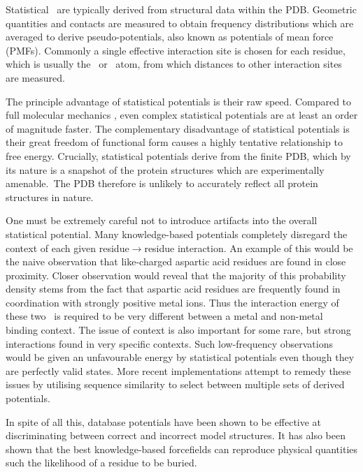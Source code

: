  Statistical \forcefields\ are typically derived from structural data within the
PDB. Geometric quantities and contacts are measured to obtain frequency distributions
which are averaged to derive pseudo-potentials, also known as potentials of mean force (PMFs). Commonly a single effective interaction site is chosen
for each residue, which is usually the \ca\ or \cb\ atom, from which distances
to other interaction sites are measured\cite{FORCEFIELD:REVIEW:KNOWLEDGEBASED}.

The principle advantage of statistical potentials is their raw speed. Compared
to full molecular mechanics \forcefields, even complex statistical potentials are at least an order of magnitude faster. The complementary disadvantage of statistical potentials is their great freedom of functional form causes
a highly tentative relationship to free energy. Crucially, statistical potentials derive from the finite PDB, which by its nature is a snapshot of the protein structures which are experimentally amenable.\
The PDB therefore is unlikely to accurately reflect all protein structures in nature.

One must be extremely careful not to introduce artifacts into the overall statistical potential. Many knowledge-based potentials completely disregard the context of each given
residue$\to$residue interaction.  An example of this would
be the naive observation that like-charged aspartic acid residues are found
in close proximity. Closer observation would reveal that the majority of
this probability density stems from the fact that aspartic acid residues
are frequently found in coordination with strongly positive metal ions. Thus
the interaction energy of these two \sidechains\ is required to be very different
between a metal and non-metal binding context. The issue of context is also
important for some rare, but strong interactions found in very specific contexts.
Such low-frequency observations would be given an unfavourable energy by
statistical potentials even though they are perfectly valid states. More
recent implementations attempt to remedy these issues by utilising sequence
similarity to select between multiple sets of derived potentials\cite{FORCEFIELD:Skolnick2000}.

In spite of all this, database potentials have been shown to be effective at discriminating between correct and incorrect model structures. It has also been shown that the best knowledge-based forcefields can reproduce physical quantities such the likelihood of a residue to be buried\cite{COMPCHEM:DFIRE}.



